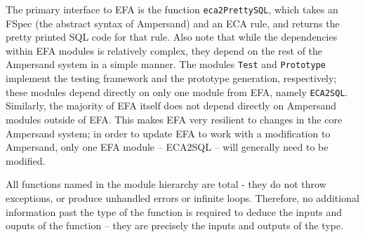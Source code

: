 The primary interface to EFA is the function \lstinline{eca2PrettySQL}, which 
takes an
FSpec (the abstract syntax of Ampersand) and an ECA rule, and returns the pretty
printed SQL code for that rule. Also note that while the dependencies within EFA
modules is relatively complex, they depend on the rest of the Ampersand system
in a simple manner. The modules \lstinline{Test} and \lstinline{Prototype} 
implement the testing
framework and the prototype generation, respectively; these modules depend
directly on only one module from EFA, namely \lstinline{ECA2SQL}. Similarly, the
majority of EFA itself does not depend directly on Ampersand modules outside of
EFA. This makes EFA very resilient to changes in the core Ampersand system; in
order to update EFA to work with a modification to Ampersand, only one EFA
module -- ECA2SQL -- will generally need to be modified. 

All functions named in the module hierarchy are total - they do not throw
exceptions, or produce unhandled errors or infinite loops. Therefore, no
additional information past the type of the function is required to deduce the
inputs and ouputs of the function -- they are precisely the inputs and outputs
of the type.


